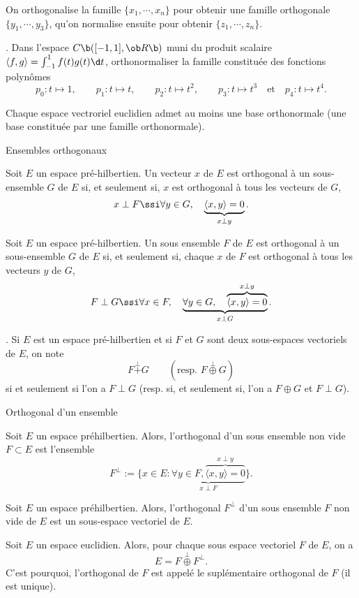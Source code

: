 \medskip
{}
On orthogonalise la famille $\{x_1,\cdots,x_n\}$ pour obtenir une famille orthogonale $\{y_1,\cdots,y_3\}$, qu'on normalise ensuite pour obtenir $\{z_1,\cdots,z_n\}$. 

\bigskip
\Exercice. Dans l'espace $\sc C\b([-1,1],\ob R\b)$ muni du 
produit scalaire $\langle f,g\rangle=\int_{-1}^1f(t)g(t)\d t$, orthonormaliser 
la famille constituée des fonctions polynômes 
$$
p_0:t\mapsto1, \qquad p_1:t\mapsto t, \qquad p_2:t\mapsto t^2, \qquad p_3:t\mapsto t^3\quad\mbox{et}\quad p_4:t\mapsto t^4.
$$ 

\Propriete []  Chaque espace vectroriel euclidien admet au moins une base orthonormale (une base constituée par une famille orthonormale). 
\bigskip


\Concept [] Ensembles orthogonaux


\Definition []  Soit $E$ un espace pré-hilbertien. Un vecteur $x$ de $E$ est orthogonal à un sous-ensemble $G$ de $E$ si, 
et seulement si, $x$ est orthogonal à tous les vecteurs de $G$, 
$$
x\perp F \ssi \forall y\in G, \quad \underbrace{\langle x,y\rangle=0}_{x\perp y}. 
$$

\Definition []  Soit $E$ un espace pré-hilbertien. Un sous ensemble $F$ de $E$ est orthogonal à un sous-ensemble $G$ de $E$ si, 
et seulement si, chaque $x$ de $F$ est orthogonal à tous les vecteurs $y$ de $G$, 
$$
F\perp G \ssi \forall x\in F,\quad \underbrace{\forall y\in G, \quad \overbrace{\langle x,y\rangle=0}^{x\perp y}}_{x\perp G}. 
$$

\Remarque. Si $E$ est un espace pré-hilbertien et si $F$ et $G$ sont deux sous-espaces vectoriels de $E$, on note 
$$
F\mathop{+}\limits^\perp G\qquad (\mbox{resp. }F\mathop{\oplus}\limits^\perp G)
$$
si et seulement si l'on a $F\perp G$ (resp. si, et seulement si, l'on a $F\oplus G$ et $F\perp G$). 
\bigskip


\Concept [] Orthogonal d'un ensemble

\Definition []  Soit $E$ un espace préhilbertien. Alors, l'orthogonal d'un sous ensemble non vide $F\subset E$ est l'ensemble 
$$
F^\perp:=\{x\in E:\underbrace{\forall y\in F, \overbrace{\langle x,y\rangle=0}^{x\perp y}}_{x\perp F}\}.
$$

\Propriete []  Soit $E$ un espace préhilbertien. Alors, l'orthogonal $F^\perp$ d'un sous ensemble $F$ non vide de $E$ est un sous-espace vectoriel de $E$. 
\bigskip

\Propriete []  Soit $E$ un espace euclidien. Alors, pour chaque sous espace vectoriel $F$ de $E$, on a 
$$
E=F\mathop{\oplus}\limits^\perp F^\perp.
$$
C'est pourquoi, l'orthogonal de $F$ est appelé le suplémentaire orthogonal de $F$ (il est unique). 
\bigskip



